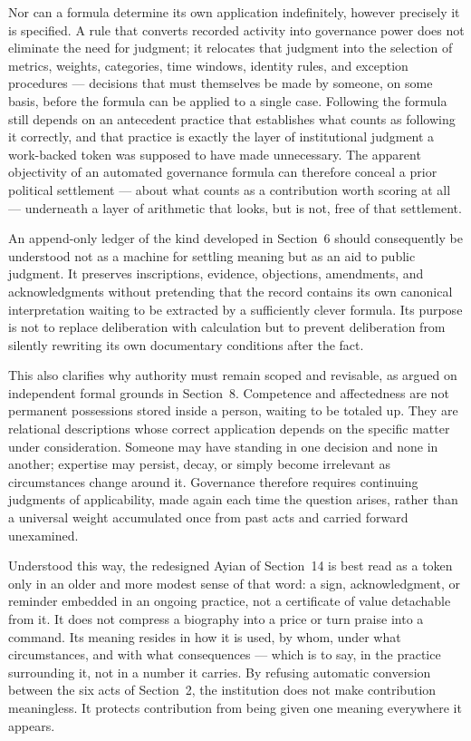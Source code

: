 \documentclass[11pt,oneside]{article}
\theoremstyle{plain}
\theoremstyle{definition}
\begin{document}
Nor can a formula determine its own application indefinitely, however precisely it is specified. A rule that converts recorded activity into governance power does not eliminate the need for judgment; it relocates that judgment into the selection of metrics, weights, categories, time windows, identity rules, and exception procedures --- decisions that must themselves be made by someone, on some basis, before the formula can be applied to a single case. Following the formula still depends on an antecedent practice that establishes what counts as following it correctly, and that practice is exactly the layer of institutional judgment a work-backed token was supposed to have made unnecessary. The apparent objectivity of an automated governance formula can therefore conceal a prior political settlement --- about what counts as a contribution worth scoring at all --- underneath a layer of arithmetic that looks, but is not, free of that settlement.

An append-only ledger of the kind developed in Section~6 should consequently be understood not as a machine for settling meaning but as an aid to public judgment. It preserves inscriptions, evidence, objections, amendments, and acknowledgments without pretending that the record contains its own canonical interpretation waiting to be extracted by a sufficiently clever formula. Its purpose is not to replace deliberation with calculation but to prevent deliberation from silently rewriting its own documentary conditions after the fact.

This also clarifies why authority must remain scoped and revisable, as argued on independent formal grounds in Section~8. Competence and affectedness are not permanent possessions stored inside a person, waiting to be totaled up. They are relational descriptions whose correct application depends on the specific matter under consideration. Someone may have standing in one decision and none in another; expertise may persist, decay, or simply become irrelevant as circumstances change around it. Governance therefore requires continuing judgments of applicability, made again each time the question arises, rather than a universal weight accumulated once from past acts and carried forward unexamined.

Understood this way, the redesigned Ayian of Section~14 is best read as a token only in an older and more modest sense of that word: a sign, acknowledgment, or reminder embedded in an ongoing practice, not a certificate of value detachable from it. It does not compress a biography into a price or turn praise into a command. Its meaning resides in how it is used, by whom, under what circumstances, and with what consequences --- which is to say, in the practice surrounding it, not in a number it carries. By refusing automatic conversion between the six acts of Section~2, the institution does not make contribution meaningless. It protects contribution from being given one meaning everywhere it appears.
\end{document}
